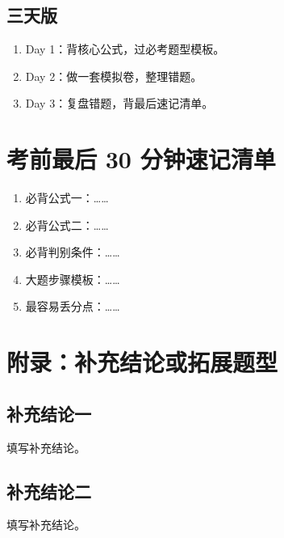 \documentclass[UTF8,zihao=-4]{ctexart}
\begin{document}
\subsection{三天版}
\begin{methodbox}[3 天冲刺安排]
\begin{enumerate}
  \item Day 1：背核心公式，过必考题型模板。
  \item Day 2：做一套模拟卷，整理错题。
  \item Day 3：复盘错题，背最后速记清单。
\end{enumerate}
\end{methodbox}

\section{考前最后 30 分钟速记清单}

\begin{keybox}[最后 30 分钟只看这些]
\begin{enumerate}
  \item 必背公式一：……
  \item 必背公式二：……
  \item 必背判别条件：……
  \item 大题步骤模板：……
  \item 最容易丢分点：……
\end{enumerate}
\end{keybox}

\section{附录：补充结论或拓展题型}

\subsection{补充结论一}
填写补充结论。

\subsection{补充结论二}
填写补充结论。
\end{document}
